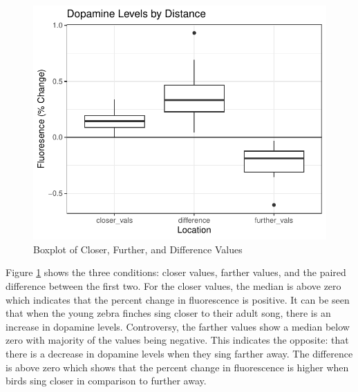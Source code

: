 \documentclass{article}\usepackage[]{graphicx}\usepackage[]{xcolor}
\makeatletter
\def\maxwidth{ %
  \ifdim\Gin@nat@width>\linewidth
    \linewidth
  \else
    \Gin@nat@width
  \fi
}
\newenvironment{knitrout}{}{} %
\makeatother
\begin{document}
\begin{enumerate}
\begin{enumerate}
\begin{figure}[H]
\begin{center}
\begin{knitrout}
{\centering \includegraphics[width=\maxwidth]{figure/unnamed-chunk-10-1} 

}


\end{knitrout}
\caption{Boxplot of Closer, Further, and Difference Values}
\label{plot1} 
\end{center}
\end{figure}

Figure \ref{plot1} shows the three conditions: closer values, farther values, and the paired difference between the first two. For the closer values, the median is above zero which indicates that the percent change in fluorescence is positive. It can be seen that when the young zebra finches sing closer to their adult song, there is an increase in dopamine levels. Controversy, the farther values show a median below zero with majority of the values being negative. This indicates the opposite: that there is a decrease in dopamine levels when they sing farther away. The difference is above zero which shows that the percent change in fluorescence is higher when birds sing closer in comparison to further away. 


\end{enumerate}
\end{enumerate}
\end{document}
